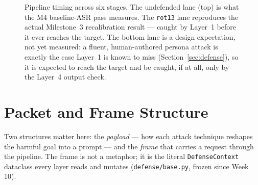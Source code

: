 \documentclass[11pt,a4paper]{article}
\begin{document}
\begin{figure}[!ht]
\caption{Pipeline timing across six stages. The undefended lane (top) is what the M4 baseline-ASR pass measures. The \texttt{rot13} lane reproduces the actual Milestone~3 recalibration result --- caught by Layer~1 before it ever reaches the target. The bottom lane is a design expectation, not yet measured: a fluent, human-authored persona attack is exactly the case Layer~1 is known to miss (Section~\ref{sec:defense}), so it is expected to reach the target and be caught, if at all, only by the Layer~4 output check.}
\label{fig:timing}
\end{figure}

\clearpage
\section{Packet and Frame Structure}

Two structures matter here: the \emph{payload} --- how each attack technique reshapes the harmful goal into a prompt --- and the \emph{frame} that carries a request through the pipeline. The frame is not a metaphor; it is the literal \texttt{DefenseContext} dataclass every layer reads and mutates (\texttt{defense/base.py}, frozen since Week 10).
\end{document}

